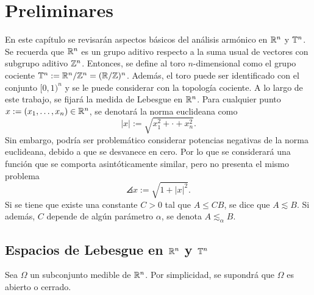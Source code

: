 \chapter{Preliminares}

En este capítulo se revisarán aspectos básicos del análisis armónico en 
$\mathbb{R}^n$ y $\mathbb{T}^n$. 
Se recuerda que $\mathbb{R}^n$ es un grupo aditivo respecto a la suma usual de vectores
con subgrupo aditivo $\mathbb{Z}^n$. Entonces, se define al toro $n$-dimensional
como el grupo cociente $\mathbb{T}^n := \mathbb{R}^n/\mathbb{Z}^n = (\mathbb{R}/\mathbb{Z})^n$. Además, 
el toro puede ser identificado con el conjunto $[0, 1)^n$ y se le puede considerar
con la topología cociente. A lo largo de este trabajo, se fijará la
medida de Lebesgue en $\mathbb{R}^n$. Para cualquier punto 
$x := (x_1, \ldots, x_n) \in \mathbb{R}^n$, se denotará la norma
euclideana como 
\begin{equation*}
    |x| := \sqrt{x_1^2 + \cdot + x_n^2}.
\end{equation*}
Sin embargo, podría ser problemático considerar potencias negativas
de la norma euclideana, debido a que se desvanece en cero. Por lo que
se considerará una función que se comporta asintóticamente similar, 
pero no presenta el mismo problema
\begin{equation*}
    \angles{x} := \sqrt{1 + |x|^2}.
\end{equation*}
Si se tiene que existe una constante $C>0$ tal que $A\leq CB$, se dice que $A\lesssim B$. Si además, $C$ depende de algún parámetro $\alpha$, se denota $A\lesssim_\alpha B$.
\section{Espacios de Lebesgue en $\mathbb{R}^n$ y $\mathbb{T}^n$ }

Sea $\Omega$ un subconjunto medible de $\mathbb{R}^n$. Por simplicidad, se supondrá
que $\Omega$ es abierto o cerrado.

